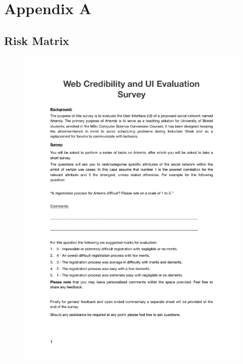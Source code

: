 %
%

\chapter{Appendix A}
\label{app:app01}

\section{Risk Matrix}

\begin{figure}[H]
	\centering
	\includegraphics[scale=.68]{chapters/appendices/figures/Evaluation Survey.pdf}
	\label{fig:Risk Matrix}
\end{figure}
\newpage

